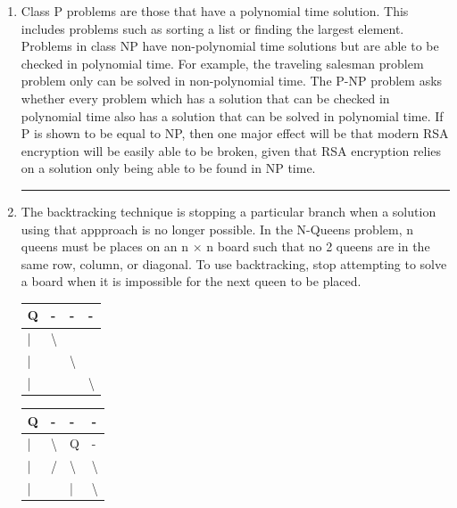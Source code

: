 \documentclass{article}
\begin{document}
\begin{enumerate}
\noindent\rule{8cm}{0.4pt}

\item Class P problems are those that have a polynomial time solution. This includes problems such as sorting a list or finding the largest element. Problems in class NP have non-polynomial time solutions but are able to be checked in polynomial time. For example, the traveling salesman problem problem only can be solved in non-polynomial time. The P-NP problem asks whether every problem which has a solution that can be checked in polynomial time also has a solution that can be solved in polynomial time. If P is shown to be equal to NP, then one major effect will be that modern RSA encryption will be easily able to be broken, given that RSA encryption relies on a solution only being able to be found in NP time. 

\noindent\rule{8cm}{0.4pt}


\item 

    The backtracking technique is stopping a particular branch when a solution using that appproach is no longer possible. In the N-Queens problem, n queens must be places on an n $\times$ n board such that no 2 queens are in the same row, column, or diagonal. To use backtracking, stop attempting to solve a board when it is impossible for the next queen to be placed. 

    \begin{table}[H]
        \begin{tabular}{|l|l|l|l|}
        \hline
        Q & - & - & - \\ \hline
        | & \textbackslash{} &  &  \\ \hline
        | &  & \textbackslash{} &  \\ \hline
        | &  &  & \textbackslash{} \\ \hline
        \end{tabular}
    \end{table}

\begin{table}[H]
\begin{tabular}{|l|l|l|l|}
\hline
Q & - & - & - \\ \hline
| & \textbackslash{} & Q & - \\ \hline
| & / & \textbackslash{} & \textbackslash{} \\ \hline
| &  & | & \textbackslash{} \\ \hline
\end{tabular}
\end{table}



\end{enumerate}
\end{document}
